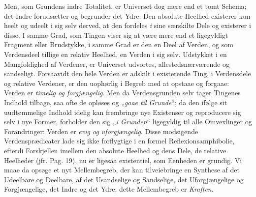 \documentclass[12pt]{book}
\begin{document}
Men, som Grundens indre Totalitet, er Universet dog mere end et tomt Schema; det Indre
forudsætter og begrunder det Ydre. Den absolute Heelhed existerer kun heelt og udeelt i sig selv
derved, at den fordeles \emph{i} sine særskilte Dele og existerer i disse. I samme Grad, som
Tingen viser sig at være mere end et ligegyldigt Fragment eller Brudstykke, i samme Grad er den
en Deel af Verden, og som Verdensdeel tillige en relativ Heelhed, en Verden i sig selv.
Udstykket i en Mangfoldighed af Verdener, er Universet udvortes, allestedsnærværende og
sandseligt. Forsaavidt den hele Verden er adskilt i existerende Ting, i Verdensdele og relative
Verdener, er den uophørlig i Begreb med at opstaae og forgaae: Verden er \emph{timelig og
forgjængelig}. Men da Verdensgrunden selv tager Tingenes Indhold tilbage, saa ofte de opløses og
„\emph{gaae til Grunde}“; da den ifølge sit uudtømmelige Indhold idelig kan frembringe nye
Existenser og reproducere sig selv i nye Former, forholder den sig „\emph{i Grunden}“ ligegyldig
til alle Omvexlinger og Forandringer: Verden er \emph{evig og uforgjængelig}. Disse modsigende
Verdensprædicater lade sig ikke forflygtige i en formel Reflexionsamphibolie, efterdi
Forskjellen imellem den absolute Heelhed og dens Dele, de relative Heelheder (jfr. Pag. 19), nu
er ligesaa existentiel, som Eenheden er grundig. Vi maae da opsøge et nyt Mellembegreb, der kan
tilveiebringe en Synthese af det Udeelbare og Deelbare, af det Usandselige og Sandselige, det
Uforgjængelige og Forgjængelige, det Indre og det Ydre; dette Mellembegreb er \emph{Kraften}.
\end{document}
